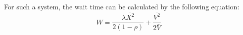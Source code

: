 For such a system, the wait time can be calculated by the following equation:
\begin{equation}
\label{eq:waiting_2}
W = \frac{\lambda\bar{X^2}}{2 (1-\rho)} + \frac{\bar{V^2}}{2\bar{V}}
\end{equation}
